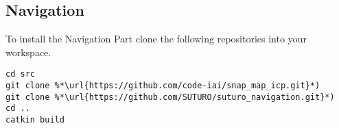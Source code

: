 \documentclass[main.tex]{subfiles}
\begin{document}
\subsection{Navigation}
To install the Navigation Part clone the following repositories into your workspace.	
\begin{lstlisting}
cd src
git clone %*\url{https://github.com/code-iai/snap_map_icp.git}*)
git clone %*\url{https://github.com/SUTURO/suturo_navigation.git}*)
cd ..
catkin build  
\end{lstlisting}
\end{document}
